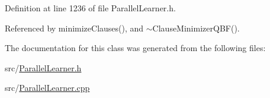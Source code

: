 Definition at line 1236 of file Parallel\-Learner.\-h.



Referenced by minimize\-Clauses(), and $\sim$\-Clause\-Minimizer\-Q\-B\-F().



The documentation for this class was generated from the following files\-:\begin{DoxyCompactItemize}
\item 
src/\hyperlink{ParallelLearner_8h}{Parallel\-Learner.\-h}\item 
src/\hyperlink{ParallelLearner_8cpp}{Parallel\-Learner.\-cpp}\end{DoxyCompactItemize}
